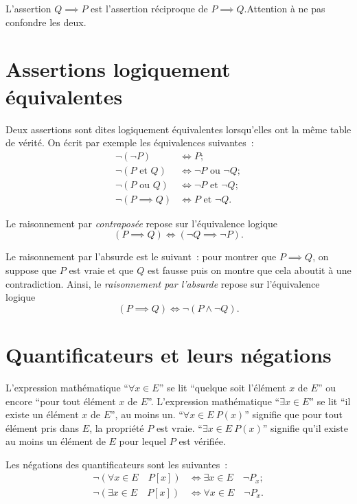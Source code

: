 L'assertion \(Q \implies P\) est l'assertion réciproque de \(P \implies
Q\).Attention à ne pas confondre les deux.

\section{Assertions logiquement
équivalentes}\label{chap0sec:assertionslogiquementequiv}

Deux assertions sont dites logiquement équivalentes lorsqu'elles ont la même
table de vérité. On écrit par exemple les équivalences suivantes~:
\begin{align}
  \neg(\neg P) &\iff P; \\
  \neg(P \text {~et~} Q) & \iff \neg P \text{~ou~} \neg Q; \\
  \neg(P \text{~ou~} Q) & \iff \neg P \text {~et~} \neg Q; \\
  \neg(P \implies Q) & \iff P \text {~et~} \neg Q.
\end{align}

Le raisonnement par \emph{contraposée} repose sur l'équivalence logique
\begin{equation}
  \boxed{(P \implies{} Q) \iff{} (\neg{Q} \implies{} \neg{P}).}
\end{equation}

Le raisonnement par l'absurde est le suivant~: pour montrer que \(P \implies
Q\), on suppose que \(P\) est vraie et que \(Q\) est fausse puis on montre que
cela aboutit à une contradiction. Ainsi, le \emph{raisonnement par l'absurde}
repose sur l'équivalence logique
\begin{equation}
  \boxed{(P\implies{Q})\iff\neg(P\land\neg{Q}).}
\end{equation}

\section{Quantificateurs et leurs négations}

L'expression mathématique ``\(\forall x \in E\)'' se lit ``quelque soit
l'élément \(x\) de \(E\)'' ou encore ``pour tout élément \(x\) de \(E\)''.
L'expression mathématique ``\(\exists x \in E\)'' se lit ``il existe un élément
\(x\) de \(E\)'', au moins un.
``\(\forall x \in E\ P(x)\)'' signifie que pour tout élément pris dans \(E\),
la propriété \(P\) est vraie.
``\(\exists x \in E \ P(x)\)'' signifie qu'il existe au moins un élément de
\(E\) pour lequel \(P\) est vérifiée.

Les négations des quantificateurs sont les suivantes~:
\begin{align}
  \neg(\forall{} x \in{} E \quad{} P[x]) &\iff{}\exists{} x \in{} E
  \quad{}\neg{}P_x;\\
  \neg(\exists{} x \in{} E \quad{} P[x]) &\iff{}\forall{} x \in{} E
  \quad{}\neg{}P_x.
\end{align}

